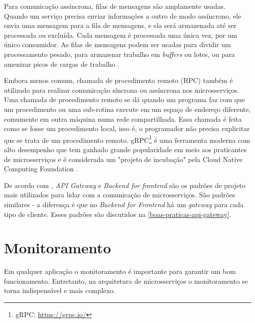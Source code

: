 Para comunicação assíncrona, filas de mensagens são amplamente usadas. Quando um serviço precisa enviar informações a outro de modo assíncrono, ele envia uma mensagem para a fila de mensagens, e ela será armazenada até ser processada ou excluída. Cada mensagem é processada uma única vez, por um único consumidor. As filas de mensagens podem ser usadas para dividir um processamento pesado, para armazenar trabalho em \emph{buffers} ou lotes, ou para amenizar picos de cargas de trabalho \cite{amazon-filas-de-mensagens}.

Embora menos comum, chamada de procedimento remoto (RPC) também é utilizado para realizar comunicação síncrona ou assíncrona nos microsserviços. Uma chamada de procedimento remoto se dá quando um programa faz com que um procedimento ou uma sub-rotina execute em um espaço de endereço diferente, comumente em outra máquina numa rede compartilhada. Essa chamada é feita como se fosse um procedimento local, isso é, o programador não precisa explicitar que se trata de um procedimento remoto. gRPC\footnote{gRPC: \url{https://grpc.io/}} é uma ferramenta moderna com alto desempenho que tem ganhado grande popularidade em meio aos praticantes de microsserviços e é considerada um "projeto de incubação" pela Cloud Native Computing Foundation \cite{microsoft-grpc}.

De acordo com , \emph{API Gateway} e \emph{Backend for frontend} são os padrões de projeto mais utilizados para lidar com a comunicação de microsserviços. São padrões similares - a diferença é que no \emph{Backend for Frontend} há um \emph{gateway} para cada tipo de cliente. Esses padrões são discutidos na \autoref{boas-praticas-api-gateway}. 


\section{Monitoramento}

Em qualquer aplicação o monitoramento é importante para garantir um bom funcionamento. Entretanto, na arquitetura de microsserviços o monitoramento se torna indispensável e mais complexo. %


